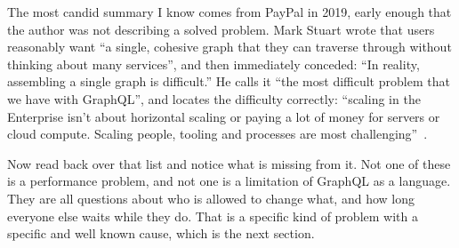 The most candid summary I know comes from PayPal in 2019, early enough that the
author was not describing a solved problem. Mark Stuart wrote that users
reasonably want \enquote{a single, cohesive graph that they can traverse through
without thinking about many services}, and then immediately conceded: \enquote{In
reality, assembling a single graph is difficult.} He calls it \enquote{the most
difficult problem that we have with GraphQL}, and locates the difficulty
correctly: \enquote{scaling in the Enterprise isn't about horizontal scaling or
paying a lot of money for servers or cloud compute. Scaling people, tooling and
processes are most challenging}~\autocite{stuart2019paypal}.

Now read back over that list and notice what is missing from it. Not one of
these is a performance problem, and not one is a limitation of GraphQL as a
language. They are all questions about who is allowed to change what, and how
long everyone else waits while they do. That is a specific kind of problem with
a specific and well known cause, which is the next section.
